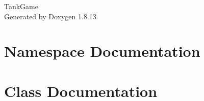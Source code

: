 \documentclass[twoside]{book}
\newcommand{\+}{\discretionary{\mbox{\scriptsize$\hookleftarrow$}}{}{}}
\newcommand{\clearemptydoublepage}{%
  \newpage{\pagestyle{empty}\cleardoublepage}%
}
\begin{document}
\hypersetup{pageanchor=false,
             bookmarksnumbered=true,
             pdfencoding=unicode
            }
\begin{titlepage}
\vspace*{7cm}
\begin{center}%
{\Large Tank\+Game }\\
\vspace*{1cm}
{\large Generated by Doxygen 1.8.13}\\
\end{center}
\end{titlepage}
\clearemptydoublepage
{}
\tableofcontents
\clearemptydoublepage
{}
\hypersetup{pageanchor=true}

\chapter{Namespace Documentation}




\chapter{Class Documentation}


























\end{document}
